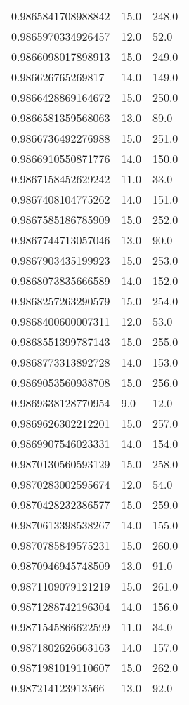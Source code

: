 \begin{center}
\begin{supertabular}[H]{p{0.30\textwidth}p{0.05\textwidth}p{0.05\textwidth}}
0.9865841708988842 & 15.0 & 248.0 \\ 
0.9865970334926457 & 12.0 & 52.0 \\ 
0.9866098017898913 & 15.0 & 249.0 \\ 
0.986626765269817 & 14.0 & 149.0 \\ 
0.9866428869164672 & 15.0 & 250.0 \\ 
0.9866581359568063 & 13.0 & 89.0 \\ 
0.9866736492276988 & 15.0 & 251.0 \\ 
0.9866910550871776 & 14.0 & 150.0 \\ 
0.9867158452629242 & 11.0 & 33.0 \\ 
0.9867408104775262 & 14.0 & 151.0 \\ 
0.9867585186785909 & 15.0 & 252.0 \\ 
0.9867744713057046 & 13.0 & 90.0 \\ 
0.9867903435199923 & 15.0 & 253.0 \\ 
0.9868073835666589 & 14.0 & 152.0 \\ 
0.9868257263290579 & 15.0 & 254.0 \\ 
0.9868400600007311 & 12.0 & 53.0 \\ 
0.9868551399787143 & 15.0 & 255.0 \\ 
0.9868773313892728 & 14.0 & 153.0 \\ 
0.9869053560938708 & 15.0 & 256.0 \\ 
0.9869338128770954 & 9.0 & 12.0 \\ 
0.9869626302212201 & 15.0 & 257.0 \\ 
0.9869907546023331 & 14.0 & 154.0 \\ 
0.9870130560593129 & 15.0 & 258.0 \\ 
0.9870283002595674 & 12.0 & 54.0 \\ 
0.9870428232386577 & 15.0 & 259.0 \\ 
0.9870613398538267 & 14.0 & 155.0 \\ 
0.9870785849575231 & 15.0 & 260.0 \\ 
0.9870946945748509 & 13.0 & 91.0 \\ 
0.9871109079121219 & 15.0 & 261.0 \\ 
0.9871288742196304 & 14.0 & 156.0 \\ 
0.9871545866622599 & 11.0 & 34.0 \\ 
0.9871802626663163 & 14.0 & 157.0 \\ 
0.9871981019110607 & 15.0 & 262.0 \\ 
0.987214123913566 & 13.0 & 92.0 \\ 

\end{supertabular}
\end{center}
